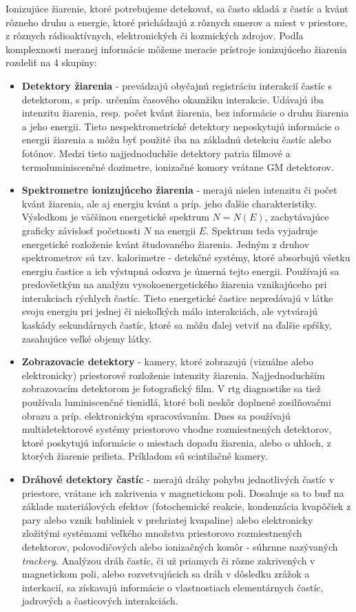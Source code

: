 \documentclass[../../main.tex]{subfiles}
\begin{document}
Ionizujúce žiarenie, ktoré potrebujeme detekovať, sa často skladá z častíc a kvánt rôzneho druhu a energie, ktoré prichádzajú z rôznych smerov a miest v priestore, z rôznych rádioaktívnych, elektronických či kozmických zdrojov. Podľa komplexnosti meranej informácie môžeme meracie prístroje ionizujúceho žiarenia rozdeliť na 4 skupiny:
\begin{itemize}
\item \textbf{Detektory žiarenia} - prevádzajú obyčajnú registráciu interakcií častíc s detektorom, s príp. určením časového okamžiku interakcie. Udávajú iba intenzitu žiarenia, resp. počet kvánt žiarenia, bez informácie o druhu žiarenia a jeho energii. Tieto nespektrometrické detektory neposkytujú informácie o energii žiarenia a môžu byť použité iba na základnú detekciu častíc alebo fotónov. Medzi tieto najjednoduchšie detektory patria filmové a termoluminiscenčné dozimetre, ionizačné komory vrátane GM detektorov.

\item \textbf{Spektrometre ionizujúceho žiarenia} - merajú nielen intenzitu či počet kvánt žiarenia, ale aj energiu kvánt a príp. jeho ďalšie charakteristiky. Výsledkom je väčšinou energetické spektrum $N=N(E)$, zachytávajúce graficky závislosť početnosti $N$ na energii $E$. Spektrum teda vyjadruje energetické rozloženie kvánt študovaného žiarenia. Jedným z druhov spektrometrov sú tzv. kalorimetre - detekčné systémy, ktoré absorbujú všetku energiu častice a ich výstupná odozva je úmerná tejto energii. Používajú sa predovšetkým na analýzu vysokoenergetického žiarenia vznikajúceho pri interakciach rýchlych častíc. Tieto energetické častice nepredávajú v látke svoju energiu pri jednej či niekoľkých málo interakciách, ale vytvárajú kaskády sekundárnych častíc, ktoré sa môžu ďalej vetviť na ďalšie spŕšky, zasahujúce veľké objemy látky.

\item \textbf{Zobrazovacie detektory} - kamery, ktoré zobrazujú (vizuálne alebo elektronicky) priestorové rozloženie intenzity žiarenia. Najjednoduchším zobrazovacím detektorom je fotografický film. V rtg diagnostike sa tiež používala luminiscenčné tienidlá, ktoré boli neskôr doplnené zosilňovačmi obrazu a príp. elektronickým spracovávaním. Dnes sa používajú multidetektorové systémy priestorovo vhodne rozmiestnených detektorov, ktoré poskytujú informácie o miestach dopadu žiarenia, alebo o uhloch, z ktorých žiarenie prilieta. Príkladom sú scintilačné kamery.

\item \textbf{Dráhové detektory častíc} - merajú dráhy pohybu jednotlivých častíc v priestore, vrátane ich zakrivenia v magnetickom poli. Dosahuje sa to buď na základe materiálových efektov (fotochemické reakcie, kondenzácia kvapôčiek z pary alebo vznik bubliniek v prehriatej kvapaline) alebo elektronicky zložitými systémami veľkého množstva priestorovo rozmiestnených detektorov, polovodičových alebo ionizačných komôr - súhrnne nazývaných \textit{trackery}. Analýzou dráh častíc, či už priamych či rôzne zakrivených v magnetickom poli, alebo rozvetvujúcich sa dráh v dôsledku zrážok a interkacií, sa získavajú informácie o vlastnostiach elementárnych častíc, jadrových a časticových interakciách.
\end{itemize}
\end{document}
